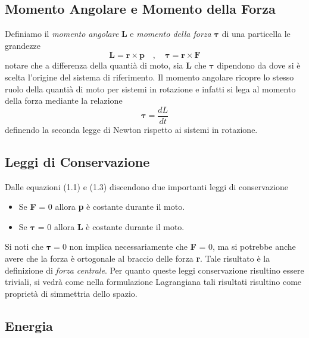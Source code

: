 \subsection{Momento Angolare e Momento della Forza}
Definiamo il \textit{momento angolare} \textbf{L} e \textit{momento della forza} $\bm{\tau}$ di una particella le grandezze
\begin{equation}
	\bm{L}=\bm{r} \times \bm{p} \quad, \quad \bm{\tau}=\bm{r} \times \bm{F}
\end{equation}
notare che a differenza della quanti\`{a} di moto, sia \textbf{L} che $\bm{\tau}$ dipendono da dove si \`{e} scelta l'origine del sistema di riferimento. Il momento angolare ricopre lo stesso ruolo della quanti\`{a} di moto per sistemi in rotazione e infatti si lega al momento della forza mediante la relazione
\begin{equation}
	\bm{\tau} = \frac{d L}{dt}
\end{equation}
definendo la seconda legge di Newton rispetto ai sistemi in rotazione.

\subsection{Leggi di Conservazione}
Dalle equazioni (1.1) e (1.3) discendono due importanti leggi di conservazione
\begin{itemize}
	\item Se \textbf{F} = 0 allora \textbf{p} \`{e} costante durante il moto.
	\item Se $\bm{\tau}$ = 0 allora \textbf{L} \`{e} costante durante il moto.
\end{itemize}
Si noti che $\bm{\tau} = 0$ non implica necessariamente che \textbf{F} = 0, ma si potrebbe anche avere che la forza \`{e} ortogonale al braccio delle forza \textbf{r}. Tale risultato \`{e} la definizione di \textit{forza centrale}. Per quanto queste leggi conservazione risultino essere triviali, si vedr\`{a} come nella formulazione Lagrangiana tali risultati risultino come propriet\`{a} di simmettria dello spazio.

\subsection{Energia}

